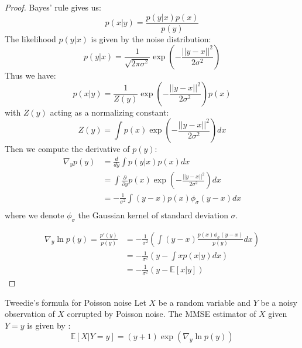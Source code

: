 \begin{proof}
    Bayes' rule gives us:
    \begin{equation*}
        p(x|y) = \frac{p(y|x)p(x)}{p(y)}
    \end{equation*}
    The likelihood $p(y|x)$ is given by the noise distribution:
    \begin{equation*}
        p(y|x) = \frac{1}{\sqrt{2 \pi \sigma^2}} \exp\left(-\frac{||y - x||^2}{2 \sigma^2}\right)
    \end{equation*}
    Thus we have:
    \begin{equation*}
        p(x|y) = \frac{1}{Z(y)} \exp\left(-\frac{||y - x||^2}{2 \sigma^2}\right) p(x)
    \end{equation*}
    with $Z(y)$ acting as a normalizing constant:
    \begin{equation*}
        Z(y) = \int p(x) \exp\left(-\frac{||y - x||^2}{2 \sigma^2}\right)dx
    \end{equation*}
    Then we compute the derivative of $p(y)$:
    \begin{align*}
        \nabla_y p(y) &= \frac{d}{dy} \int p(y|x)p(x) dx \\
        &= \int \frac{\partial}{\partial y} p(x) \exp\left(-\frac{||y - x||^2}{2 \sigma^2}\right) dx \\
        &= - \frac{1}{\sigma^2} \int (y - x) p(x) \phi_{\sigma}(y - x) dx \\
    \end{align*}
    where we denote $\phi_{\sigma}$ the Gaussian kernel of standard deviation $\sigma$.

    \begin{align*}
        \nabla_y \ln p(y) = \frac{p'(y)}{p(y)} &= - \frac{1}{\sigma^2} \left( \int (y - x) \frac{p(x) \phi_{\sigma}(y - x)}{p(y)} dx \right) \\
        &= - \frac{1}{\sigma^2} \left( y - \int x p(x|y) dx \right) \\
        &= - \frac{1}{\sigma^2} (y - \mathbb{E}[x|y])
    \end{align*}
\end{proof}

\begin{theorem}{Tweedie's formula for Poisson noise}
    Let $X$ be a random variable and $Y$ be a noisy observation of $X$ corrupted by Poisson noise. The MMSE estimator of $X$ given $Y = y$ is given by :
    \begin{equation}
        \mathbb{E}\left[X | Y = y\right] = (y + 1)\exp \left( \nabla_y \ln p(y)\right)
    \end{equation}
\end{theorem}

